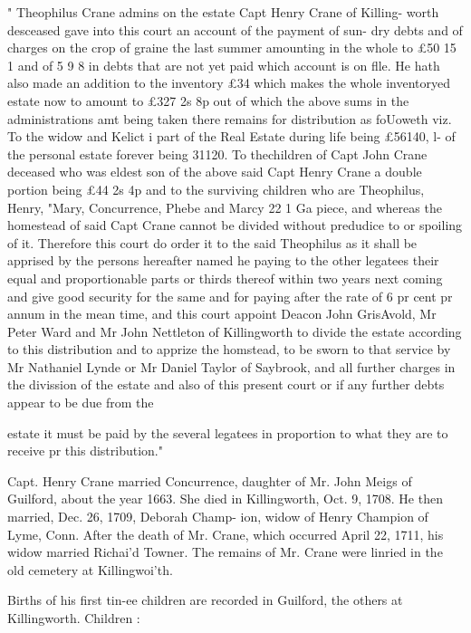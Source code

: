 \documentclass{book}
\begin{document}
" Theophilus Crane admins on the estate Capt Henry Crane of Killing- 
worth desceased gave into this court an account of the payment of sun- 
dry debts and of charges on the crop of graine the last summer amounting 
in the whole to £50  15  1 and of 5  9  8 in debts that are not yet paid 
which account is on flle. He hath also made an addition to the inventory 
£34 which makes the whole inventoryed estate now to amount to £327  
2s  8p out of which the above sums in the administrations amt being 
taken there remains for distribution as foUoweth viz. To the widow and 
Kelict i part of the Real Estate during life being £56140, l- of the 
personal estate forever being 31120. To thechildren of Capt John 
Crane deceased who was eldest son of the above said Capt Henry Crane 
a double portion being £44  2s  4p and to the surviving children who are 
Theophilus, Henry, "Mary, Concurrence, Phebe and Marcy 22  1  Ga 
piece, and whereas the homestead of said Capt Crane cannot be divided 
without predudice to or spoiling of it. Therefore this court do order it 
to the said Theophilus as it shall be apprised by the persons hereafter 
named he paying to the other legatees their equal and proportionable 
parts or thirds thereof within two years next coming and give good 
security for the same and for paying after the rate of 6 pr cent pr 
annum in the mean time, and this court appoint Deacon John GrisAvold, 
Mr Peter Ward and Mr John Nettleton of Killingworth to divide the 
estate according to this distribution and to apprize the homstead, to be 
sworn to that service by Mr Nathaniel Lynde or Mr Daniel Taylor of 
Saybrook, and all further charges in the divission of the estate and also 
of this present court or if any further debts appear to be due from the 




estate it must be paid by the several legatees in proportion to what they 
are to receive pr this distribution." 

Capt. Henry Crane married Concurrence, daughter of Mr. John 
Meigs of Guilford, about the year 1663. She died in Killingworth, 
Oct. 9, 1708. He then married, Dec. 26, 1709, Deborah Champ- 
ion, widow of Henry Champion of Lyme, Conn. After the death 
of Mr. Crane, which occurred April 22, 1711, his widow married 
Richai'd Towner. The remains of Mr. Crane were linried in the 
old cemetery at Killingwoi'th. 

Births of his first tin-ee children are recorded in Guilford, the 
others at Killingworth. Children : 
\end{document}
